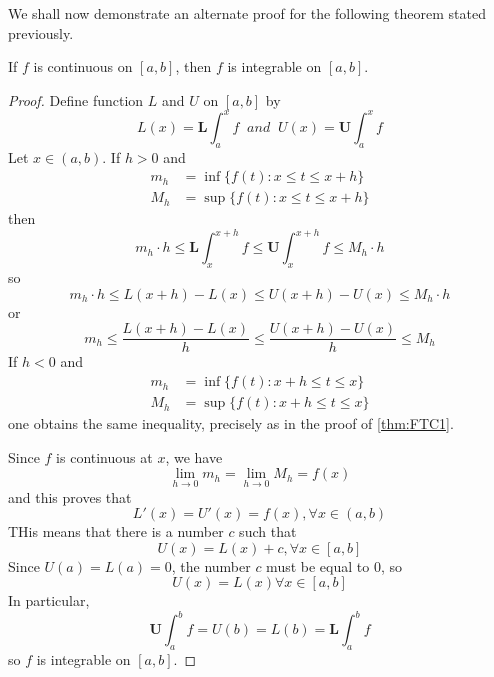 We shall now demonstrate an alternate proof for the following theorem stated previously.



\begin{theorem}
    If $f$ is continuous on $[a,b]$, then $f$ is integrable on $[a,b]$.
\end{theorem}
\begin{proof}
    Define function $L$ and $U$ on $[a,b]$ by \begin{equation*}
        L(x) = \mathbf{L}\int_a^xf\;\;and\;\;U(x) = \mathbf{U}\int_a^xf
    \end{equation*}
    Let $x \in (a,b)$. If $h > 0$ and \begin{align*}
        m_h &= \inf\{f(t):x\leq t \leq x+h\} \\
        M_h &= \sup\{f(t): x\leq t\leq x+h\} 
    \end{align*}
    then \begin{equation*}
        m_h\cdot h \leq \mathbf{L}\int_x^{x+h}f \leq \mathbf{U}\int_x^{x+h}f\leq M_h\cdot h
    \end{equation*}
    so \begin{equation*}
        m_h\cdot h \leq L(x+h) - L(x) \leq U(x+h) - U(x) \leq M_h\cdot h
    \end{equation*}
    or \begin{equation*}
        m_h\leq \frac{L(x+h)-L(x)}{h} \leq \frac{U(x+h)-U(x)}{h} \leq M_h
    \end{equation*}
    If $h < 0$ and \begin{align*}
        m_h &= \inf\{f(t):x+h\leq t \leq x\} \\
        M_h &= \sup\{f(t): x+h\leq t\leq x\} 
    \end{align*}
    one obtains the same inequality, precisely as in the proof of \ref{thm:FTC1}.

    Since $f$ is continuous at $x$, we have \begin{equation*}
        \lim\limits_{h\rightarrow 0}m_h = \lim\limits_{h\rightarrow 0}M_h = f(x)
    \end{equation*}
    and this proves that \begin{equation*}
        L'(x) = U'(x) = f(x),\forall x\in(a,b)
    \end{equation*}
    THis means that there is a number $c$ such that \begin{equation*}
        U(x) = L(x) + c,\forall x \in [a,b]
    \end{equation*}
    Since $U(a) = L(a) = 0$, the number $c$ must be equal to $0$, so \begin{equation*}
        U(x) = L(x) \forall x \in [a,b]
    \end{equation*}
    In particular, \begin{equation*}
        \mathbf{U}\int_a^bf = U(b) = L(b) = \mathbf{L}\int_a^bf
    \end{equation*}
    so $f$ is integrable on $[a,b]$.
\end{proof}


